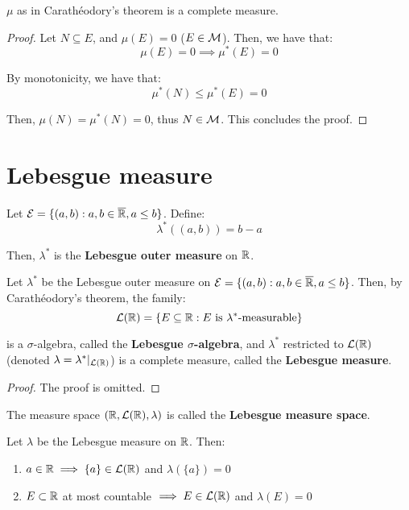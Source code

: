 \begin{fcorollary}
    $\mu$ as in Carathéodory's theorem is a complete measure.
\end{fcorollary}

\begin{proof}
    Let $N \subseteq E$, and $\mu(E) = 0$ ($E \in \mathcal{M}$). Then, we have that:
    $$\mu(E) = 0 \implies \mu^{*}(E) = 0$$

    By monotonicity, we have that:
    $$\mu^{*}(N) \leq \mu^{*}(E) = 0$$

    Then, $\mu(N) = \mu^{*}(N) = 0$, thus $N \in \mathcal{M}$. This concludes the proof.

\end{proof}

\section{Lebesgue measure}

\begin{fdefinition}
    Let $\mathcal{E} = \{(a, b): a, b \in \overline{\mathbb{R}}, a \leq b\}$. Define:
    $$\lambda^{*}((a, b)) = b - a$$

    Then, $\lambda^{*}$ is the \textbf{Lebesgue outer measure} on $\mathbb{R}$.
\end{fdefinition}

\begin{ftheorem}
    Let $\lambda^{*}$ be the Lebesgue outer measure on $\mathcal{E} = \{(a, b): a, b \in \overline{\mathbb{R}}, a \leq b\}$.
    Then, by Carathéodory's theorem, the family:
    $$\mathcal{L}(\mathbb{R}) = \{E \subseteq \mathbb{R}: E \text{ is } \lambda^{*}\text{-measurable}\}$$

    is a $\sigma$-algebra, called the \textbf{Lebesgue $\sigma$-algebra},
    and $\lambda^{*}$ restricted to $\mathcal{L}(\mathbb{R})$ (denoted $\lambda = \lambda^{*} |_{\mathcal{L}(\mathbb{R})}$)
    is a complete measure, called the \textbf{Lebesgue measure}. 
\end{ftheorem}

\begin{proof}
    The proof is omitted.

\end{proof}

\begin{fremark}
    The measure space $(\mathbb{R}, \mathcal{L}(\mathbb{R}), \lambda)$ is called the \textbf{Lebesgue measure space}.
\end{fremark}

\begin{fproposition}
    Let $\lambda$ be the Lebesgue measure on $\mathbb{R}$. Then:
    \vspace{1em}

    \begin{enumerate}[label=(\roman*)]
        \item $a \in \mathbb{R} \implies \{a\} \in \mathcal{L}(\mathbb{R})$ and $\lambda(\{a\}) = 0$
        \vspace{1em}

        \item $E \subset \mathbb{R}$ at most countable $\implies E \in \mathcal{L}(\mathbb{R})$ and $\lambda(E) = 0$
    \end{enumerate}
\end{fproposition}

